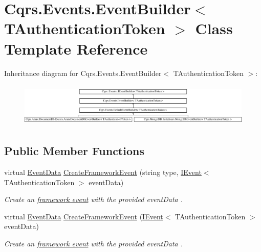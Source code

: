 \hypertarget{classCqrs_1_1Events_1_1EventBuilder}{}\section{Cqrs.\+Events.\+Event\+Builder$<$ T\+Authentication\+Token $>$ Class Template Reference}
\label{classCqrs_1_1Events_1_1EventBuilder}
Inheritance diagram for Cqrs.\+Events.\+Event\+Builder$<$ T\+Authentication\+Token $>$\+:\begin{figure}[H]
\begin{center}
\leavevmode
\includegraphics[height=2.117202cm]{classCqrs_1_1Events_1_1EventBuilder}
\end{center}
\end{figure}
\subsection*{Public Member Functions}
\begin{DoxyCompactItemize}
\item 
virtual \hyperlink{classCqrs_1_1Events_1_1EventData}{Event\+Data} \hyperlink{classCqrs_1_1Events_1_1EventBuilder_aa6a794ef27f2795802a4390fd16535f6_aa6a794ef27f2795802a4390fd16535f6}{Create\+Framework\+Event} (string type, \hyperlink{interfaceCqrs_1_1Events_1_1IEvent}{I\+Event}$<$ T\+Authentication\+Token $>$ event\+Data)
\begin{DoxyCompactList}\small\item\em Create an \hyperlink{}{framework event} with the provided {\itshape event\+Data} . \end{DoxyCompactList}\item 
virtual \hyperlink{classCqrs_1_1Events_1_1EventData}{Event\+Data} \hyperlink{classCqrs_1_1Events_1_1EventBuilder_abcc2515f98e4852ab656f1868e7a344c_abcc2515f98e4852ab656f1868e7a344c}{Create\+Framework\+Event} (\hyperlink{interfaceCqrs_1_1Events_1_1IEvent}{I\+Event}$<$ T\+Authentication\+Token $>$ event\+Data)
\begin{DoxyCompactList}\small\item\em Create an \hyperlink{}{framework event} with the provided {\itshape event\+Data} . \end{DoxyCompactList}\end{DoxyCompactItemize}
